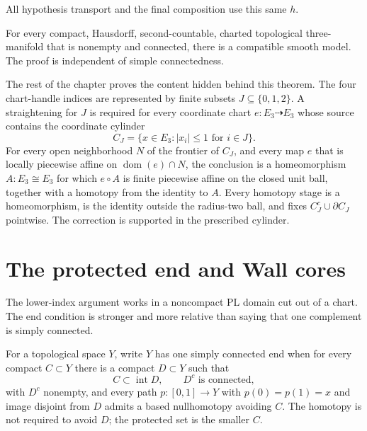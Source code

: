 All hypothesis transport and the final composition use this same $h$.

\begin{theorem}
\label{thm:m76}
For every compact, Hausdorff, second-countable, charted topological
three-manifold that is nonempty and connected, there is a compatible
smooth model. The proof is independent of simple connectedness.
\end{theorem}

The rest of the chapter proves the content hidden behind this theorem.  The
four chart-handle indices are represented by finite subsets
$J\subseteq\{0,1,2\}$.  A straightening for $J$ is required for every
coordinate chart $e:E_3\dashrightarrow E_3$ whose source contains the
coordinate cylinder
\[
 C_J=\{x\in E_3: |x_i|\leq 1\text{ for }i\in J\}.
\]
For every open neighborhood $N$ of the frontier of $C_J$, and every
map $e$ that is locally piecewise affine on $\operatorname{dom}(e)\cap N$, the conclusion
is a homeomorphism $A:E_3\cong E_3$ for which $e\circ A$ is finite
piecewise affine on the closed unit ball, together with a homotopy from the
identity to $A$.
Every homotopy stage is a homeomorphism, is the identity outside the
radius-two ball, and fixes $C_J^c\cup\partial C_J$ pointwise.
The correction is supported in the prescribed cylinder.

\section{The protected end and Wall cores}
\label{sec:wall-core}

The lower-index argument works in a noncompact PL domain cut out of a chart.
The end condition is stronger and more relative than saying that one
complement is simply connected.

\begin{definition}
\label{def:one-end}
For a topological space $Y$, write $Y$ has one simply connected end when
for every compact $C\subset Y$ there is a compact $D\subset Y$ such that
\[
C\subset\operatorname{int}D,\qquad D^c\text{ is connected},
\]
with $D^c$ nonempty, and every path $p:[0,1]\to Y$ with $p(0)=p(1)=x$
and image disjoint from $D$ admits a based nullhomotopy avoiding $C$.
The homotopy is not
required to avoid $D$; the protected set is the smaller $C$.
\end{definition}

